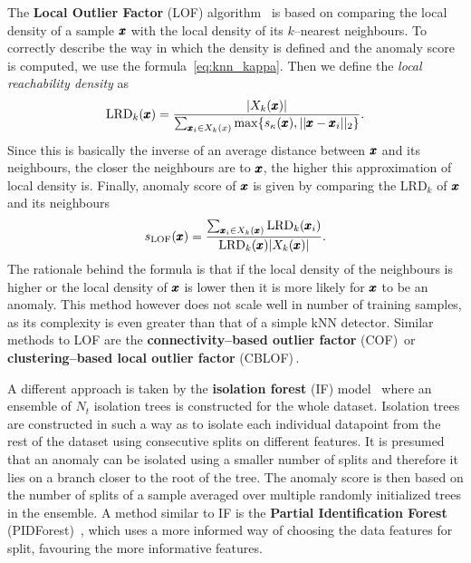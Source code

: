 The \textbf{Local Outlier Factor} (LOF) algorithm~\cite{breunig2000lof} is based on comparing the local density of a sample $\pmb{{x}}$ with the local density of its $k$--nearest neighbours. To correctly describe the way in which the density is defined and the anomaly score is computed, we use the formula~\eqref{eq:knn_kappa}. Then we define the \textit{local reachability density} as 
\begin{equation}
  \text{LRD}_k(\pmb{{x}})=\frac{|X_k(\pmb{{x}})|}{\sum_{\pmb{{x}}_i\in X_k(x)} \max \lbrace s_{\kappa}(\pmb{{x}}), \vert \vert \pmb{{x}} - \pmb{{x}}_i \vert \vert_2 \rbrace }.
\end{equation}
Since this is basically the inverse of an average distance between $\pmb{{x}}$ and its neighbours, the closer the neighbours are to $\pmb{{x}}$, the higher this approximation of local density is. Finally, anomaly score of $\pmb{{x}}$ is given by comparing the $\text{LRD}_k$ of $\pmb{{x}}$ and its neighbours 
\begin{equation}
  s_{\text{LOF}}(\pmb{{x}})=\frac{\sum_{\pmb{{x}}_i\in X_k(\pmb{{x}})} \text{LRD}_k(\pmb{{x}}_i)}{\text{LRD}_k(\pmb{{x}}) |X_k(\pmb{{x}})|}.
\end{equation}
The rationale behind the formula is that if the local density of the neighbours is higher or the local density of $\pmb{{x}}$ is lower then it is more likely for $\pmb{{x}}$ to be an anomaly. This method however does not scale well in number of training samples, as its complexity is even greater than that of a simple kNN detector. Similar methods to LOF are the \textbf{connectivity--based outlier factor} (COF)\,\cite{tang2002enhancing} or \textbf{clustering--based local outlier factor} (CBLOF)\,\cite{he2003discovering}.

A different approach is taken by the \textbf{isolation forest }(IF) model~\cite{liu2008isolation} where an ensemble of $N_t$ isolation trees is constructed for the whole dataset. Isolation trees are constructed in such a way as to isolate each individual datapoint from the rest of the dataset using consecutive splits on different features. It is presumed that an anomaly can be isolated using a smaller number of splits and therefore it lies on a branch closer to the root of the tree. The anomaly score is then based on the number of splits of a sample averaged over multiple randomly initialized trees in the ensemble. A method similar to IF is the \textbf{Partial Identification Forest} (PIDForest)~\cite{gopalanPIDForestAnomalyDetection2019}, which uses a more informed way of choosing the data features for split, favouring the more informative features.

